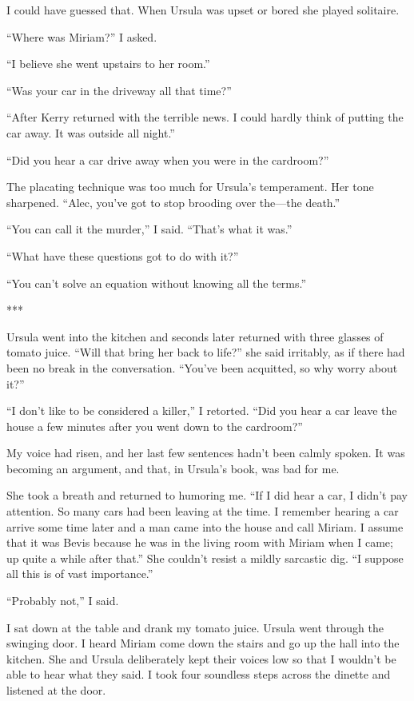 \documentclass{novel}
\begin{document}
{I could have guessed that. When Ursula was upset or bored she played solitaire.

“Where was Miriam?” I asked.

“I believe she went upstairs to her room.”

“Was your car in the driveway all that time?”

“After Kerry returned with the terrible news. I could hardly think of putting the car away. It was outside all night.”

“Did you hear a car drive away when you were in the cardroom?”

The placating technique was too much for Ursula’s temperament. Her tone sharpened. “Alec, you’ve got to stop brooding over the—the death.”

“You can call it the murder,” I said. “That’s what it was.”

“What have these questions got to do with it?”

“You can’t solve an equation without knowing all the terms.”

***

Ursula went into the kitchen and seconds later returned with three glasses of tomato juice. “Will that bring her back to life?” she said irritably, as if there had been no break in the conversation. “You’ve been acquitted, so why worry about it?”

“I don’t like to be considered a killer,” I retorted. “Did you hear a car leave the house a few minutes after you went down to the cardroom?”

My voice had risen, and her last few sentences hadn’t been calmly spoken. It was becoming an argument, and that, in Ursula’s book, was bad for me.

She took a breath and returned to humoring me. “If I did hear a car, I didn’t pay attention. So many cars had been leaving at the time. I remember hearing a car arrive some time later and a man came into the house and call Miriam. I assume that it was Bevis because he was in the living room with Miriam when I came; up quite a while after that.” She couldn’t resist a mildly sarcastic dig. “I suppose all this is of vast importance.”

“Probably not,” I said.

I sat down at the table and drank my tomato juice. Ursula went through the swinging door. I heard Miriam come down the stairs and go up the hall into the kitchen. She and Ursula deliberately kept their voices low so that I wouldn’t be able to hear what they said. I took four soundless steps across the dinette and listened at the door.

}
\end{document}

